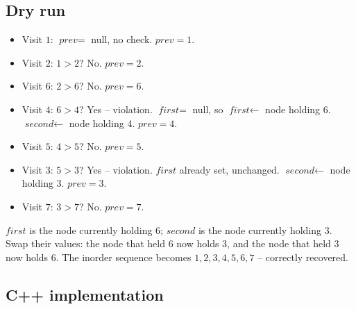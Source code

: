 \subsection*{Dry run}


\begin{itemize}
  \item Visit $1$: $\textit{prev}=$ null, no check. $\textit{prev}=1$.
  \item Visit $2$: $1>2$? No. $\textit{prev}=2$.
  \item Visit $6$: $2>6$? No. $\textit{prev}=6$.
  \item Visit $4$: $6>4$? Yes -- violation. $\textit{first}=$ null, so
        $\textit{first} \gets$ node holding $6$. $\textit{second} \gets$
        node holding $4$. $\textit{prev}=4$.
  \item Visit $5$: $4>5$? No. $\textit{prev}=5$.
  \item Visit $3$: $5>3$? Yes -- violation. $\textit{first}$ already
        set, unchanged. $\textit{second} \gets$ node holding $3$.
        $\textit{prev}=3$.
  \item Visit $7$: $3>7$? No. $\textit{prev}=7$.
\end{itemize}

$\textit{first}$ is the node currently holding $6$; $\textit{second}$ is
the node currently holding $3$. Swap their values: the node that held $6$
now holds $3$, and the node that held $3$ now holds $6$. The inorder
sequence becomes $1,2,3,4,5,6,7$ -- correctly recovered.

\subsection*{C++ implementation}

